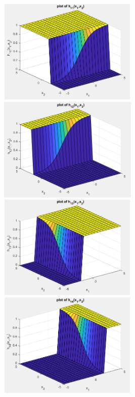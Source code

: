 \documentclass[solution,addpoints,12pt]{exam}
\begin{document}
\begin{questions}
\begin{parts}
\begin{solution}
                \includegraphics[width=7cm,height=5cm]{4}
                \includegraphics[width=7cm,height=5cm]{5}\\

                \includegraphics[width=7cm,height=5cm]{6}
                \includegraphics[width=7cm,height=5cm]{7}\\
                

\end{solution}
\end{parts}
\end{questions}
\end{document}
